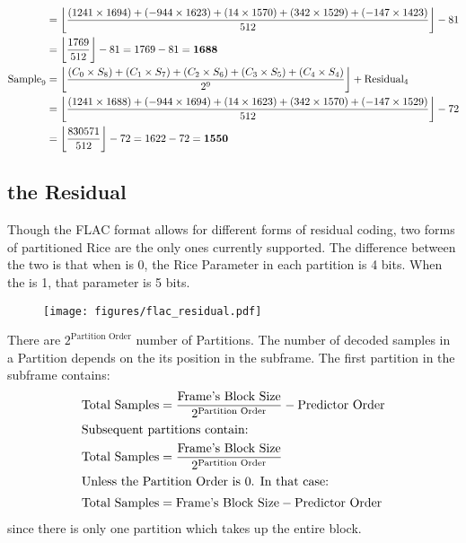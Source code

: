 \begin{align*}
&= \left\lfloor \frac{(1241 \times 1694) + (-944 \times 1623) + (14 \times 1570) + (342 \times 1529) + (-147 \times 1423)}{512}\right\rfloor - 81 \\
&= \left\lfloor \frac{1769}{512} \right\rfloor - 81 = 1769 - 81 = \textbf{1688} \\
\text{Sample}_9 &= \left\lfloor \frac{(C_0 \times S_8) + (C_1 \times S_7) + (C_2 \times S_6) + (C_3 \times S_5) + (C_4 \times S_4)}{2 ^ 9}\right\rfloor + \text{Residual}_4 \\
&= \left\lfloor \frac{(1241 \times 1688) + (-944 \times 1694) + (14 \times 1623) + (342 \times 1570) + (-147 \times 1529)}{512}\right\rfloor - 72 \\
&= \left\lfloor \frac{830571}{512} \right\rfloor - 72 = 1622 - 72 = \textbf{1550} \\
\end{align*}

\clearpage

\subsection{the Residual}
\label{flac_residual}
Though the FLAC format allows for different forms of
residual coding, two forms of partitioned Rice are the only ones
currently supported.
The difference between the two is that when  is 0,
the Rice Parameter in each partition is 4 bits.
When the  is 1, that parameter is 5 bits.
\begin{figure}[h]
\texttt{[image: figures/flac\_residual.pdf]}
\end{figure}
\par
\noindent

There are $2 ^ \text{Partition Order}$ number of Partitions.
The number of decoded samples in a Partition depends on the
its position in the subframe.
The first partition in the subframe contains:
\begin{align}
\text{Total Samples} &= \frac{\text{Frame's Block Size}}{2 ^ {\text{Partition Order}}} - \text{Predictor Order} \\
\intertext{Subsequent partitions contain:}
\text{Total Samples} &= \frac{\text{Frame's Block Size}}{2 ^ {\text{Partition Order}}} \\
\intertext{Unless the Partition Order is 0.  In that case:}
\text{Total Samples} &= \text{Frame's Block Size} - \text{Predictor Order}
\end{align}
\noindent
since there is only one partition which takes up the entire block.

